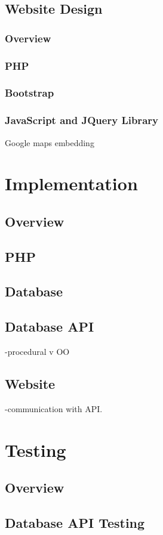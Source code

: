 \documentclass[11pt]{article}
\begin{document}
	\subsection{Website Design}
		\subsubsection{Overview}
		\subsubsection{PHP}
		\subsubsection{Bootstrap}
		\subsubsection{JavaScript and JQuery Library}
		Google maps embedding

\section{Implementation}
	\subsection{Overview}
	\subsection{PHP}
	\subsection{Database}
	\subsection{Database API}
	-procedural v OO
	\subsection{Website}
	-communication with API.
	
\section{Testing}
	\subsection{Overview}
	\subsection{Database API Testing}
\end{document}
